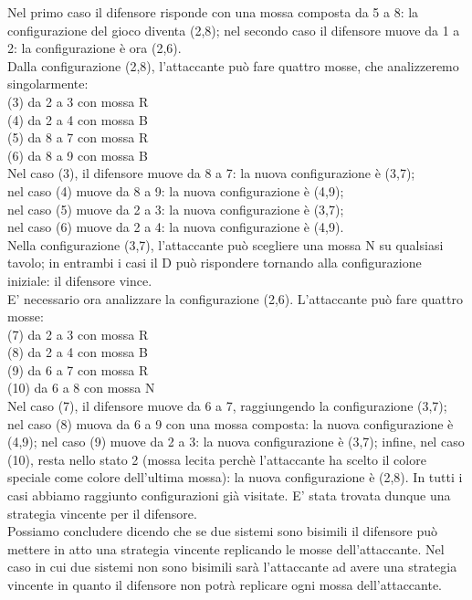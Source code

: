 \documentclass[a4paper,11pt,twoside,openright]{report}
\begin{document}
Nel primo caso il difensore risponde con una mossa composta da 5 a 8: la configurazione del gioco diventa (2,8); nel secondo caso il difensore muove da 1 a 2: la configurazione è ora (2,6).\\
Dalla configurazione (2,8), l'attaccante può fare quattro mosse, che analizzeremo singolarmente:\\
(3) da 2 a 3 con mossa R\\
(4) da 2 a 4 con mossa B\\
(5) da 8 a 7 con mossa R\\
(6) da 8 a 9 con mossa B\\

Nel caso (3), il difensore muove da 8 a 7: la nuova configurazione è (3,7);\\
nel caso (4) muove da 8 a 9: la nuova configurazione è (4,9);\\
nel caso (5) muove da 2 a 3: la nuova configurazione è (3,7);\\
nel caso (6) muove da 2 a 4: la nuova configurazione è (4,9).\\

Nella configurazione (3,7), l'attaccante può scegliere una mossa N su qualsiasi tavolo; in entrambi i casi il D può rispondere tornando alla configurazione iniziale: il difensore vince.\\
E' necessario ora analizzare la configurazione (2,6). L'attaccante può fare quattro mosse:\\
(7) da 2 a 3 con mossa R\\
(8) da 2 a 4 con mossa B\\
(9) da 6 a 7 con mossa R\\
(10) da 6 a 8 con mossa N\\

Nel caso (7), il difensore muove da 6 a 7, raggiungendo la configurazione (3,7); nel caso (8) muova da 6 a 9 con una mossa composta: la nuova configurazione è (4,9); nel caso (9) muove da 2 a 3: la nuova configurazione è (3,7); infine, nel caso (10), resta nello stato 2 (mossa lecita perchè l'attaccante ha scelto il colore speciale come colore dell'ultima mossa): la nuova configurazione è (2,8). In tutti i casi abbiamo raggiunto configurazioni già visitate. E' stata  trovata dunque una strategia vincente per il difensore.\\
Possiamo concludere dicendo che se due sistemi sono bisimili il difensore può mettere in atto una strategia vincente replicando le mosse dell'attaccante. Nel caso in cui due sistemi non sono bisimili sarà l'attaccante ad avere una strategia vincente in quanto il difensore non potrà replicare ogni mossa dell'attaccante.
\end{document}
